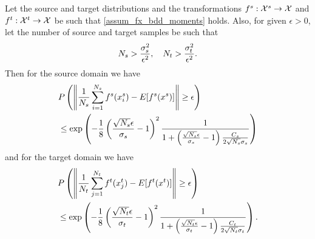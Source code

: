 \documentclass[review,supplement,onefignum,onetabnum]{siamonline250211}
\begin{document}
\begin{lemma}
    \label{lem:bernstein_src_trg}
    Let the source and target distributions and the transformations $f^s: \mathcal{X}^s \rightarrow \mathcal{X}$ and $f^t: \mathcal{X}^t \rightarrow \mathcal{X}$ be such that \cref{assum_fx_bdd_moments} holds. Also, for given $\epsilon>0$, let the number of source and target samples be such that
    \begin{equation*}
    N_s > \frac{\sigma_s^2}{\epsilon^2}
    , \quad
    N_t > \frac{\sigma_t^2}{\epsilon^2}.
    \end{equation*}
    Then for the source domain we have
    \begin{equation}
    \label{eq:lem_src_empmean}
    \begin{split}
    &P\left( \left \|  \frac{1}{N_s}  \sum_{i=1}^{N_s}  f^s(x^s_i)  -  E[f^s(x^s)] \right \|  \geq  \epsilon \right) \\
    &\leq
      \exp \left(  
      -\frac{1}{8}\left( \frac{\sqrt{N_s} \epsilon}{\sigma_s} -1\right)^2 \frac{1}{1+\left( \frac{\sqrt{N_s} \epsilon}{\sigma_s} -1 \right)\frac{C_s}{2 \sqrt{N_s} \sigma_s }}
       \right) 
       \end{split}
    \end{equation} 
    and for the target domain we have
    \begin{equation}
    \label{eq:lem_trg_empmean}
    \begin{split}
    &P\left( \left \|  \frac{1}{N_t}  \sum_{j=1}^{N_t}  f^t(x^t_j)  -  E[f^t(x^t)] \right \|  \geq  \epsilon \right) \\
    &\leq
      \exp \left(  
      -\frac{1}{8}\left( \frac{\sqrt{N_t} \epsilon}{\sigma_t} -1\right)^2 \frac{1}{1+\left( \frac{\sqrt{N_t} \epsilon}{\sigma_t} -1 \right)\frac{C_t}{2 \sqrt{N_t} \sigma_t }}
       \right) .
    \end{split}
    \end{equation}
\end{lemma}
\end{document}
